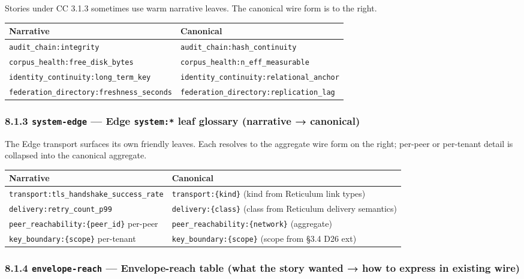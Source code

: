 \documentclass[11pt]{article}
\begin{document}
Stories under CC 3.1.3 sometimes use warm narrative leaves. The canonical wire form is to the right.


{\footnotesize
\begin{longtable}{|p{8.0cm}|p{8.0cm}|}\hline
\textbf{Narrative} & \textbf{Canonical} \\ \hline\endhead
\texttt{audit\_chain:integrity} & \texttt{audit\_chain:hash\_continuity} \\ \hline
\texttt{corpus\_health:free\_disk\_bytes} & \texttt{corpus\_health:n\_eff\_measurable} \\ \hline
\texttt{identity\_continuity:long\_term\_key} & \texttt{identity\_continuity:relational\_anchor} \\ \hline
\texttt{federation\_directory:freshness\_seconds} & \texttt{federation\_directory:replication\_lag} \\ \hline
\end{longtable}}


\subsubsection*{8.1.3 \texttt{system-edge} — Edge \texttt{system:*} leaf glossary (narrative → canonical)}


The Edge transport surfaces its own friendly leaves. Each resolves to the aggregate wire form on the right; per-peer or per-tenant detail is collapsed into the canonical aggregate.


{\footnotesize
\begin{longtable}{|p{8.0cm}|p{8.0cm}|}\hline
\textbf{Narrative} & \textbf{Canonical} \\ \hline\endhead
\texttt{transport:tls\_handshake\_success\_rate} & \texttt{transport:\{kind\}} (kind from Reticulum link types) \\ \hline
\texttt{delivery:retry\_count\_p99} & \texttt{delivery:\{class\}} (class from Reticulum delivery semantics) \\ \hline
\texttt{peer\_reachability:\{peer\_id\}} per-peer & \texttt{peer\_reachability:\{network\}} (aggregate) \\ \hline
\texttt{key\_boundary:\{scope\}} per-tenant & \texttt{key\_boundary:\{scope\}} (scope from §3.4 D26 ext) \\ \hline
\end{longtable}}


\subsubsection*{8.1.4 \texttt{envelope-reach} — Envelope-reach table (what the story wanted → how to express in existing wire)}
\end{document}
